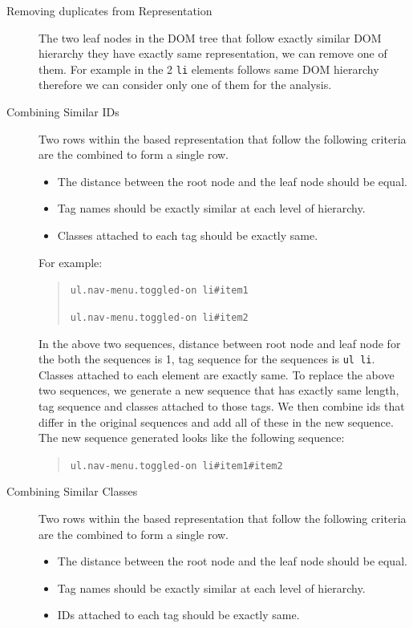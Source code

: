 		\begin{description}
			\item[Removing duplicates from \css Representation]
			The two leaf nodes in the DOM tree that follow exactly similar DOM hierarchy \ie they have exactly same \css representation, we can remove one of them. For example in  the 2 \texttt{li} elements follows same DOM hierarchy therefore we can consider only one of them for the analysis.
		
			\item[Combining Similar IDs]
			Two rows within the \css based representation that follow the following criteria are the combined to form a single row. 

			\begin{itemize}
				\item The distance between the root node and the leaf node should be equal.
				\item Tag names should be exactly similar at each level of hierarchy.
				\item Classes attached to each tag should be exactly same.
			\end{itemize}

			For example:
			
			\begin{quote}
				\texttt{ul.nav-menu.toggled-on li\#item1}
	
				\texttt{ul.nav-menu.toggled-on li\#item2}
			\end{quote}

			In the above two sequences, distance between root node and leaf node for the both the sequences is 1, tag sequence for the sequences is \texttt{ul li}. Classes attached to each element are exactly same. To replace the above two sequences, we generate a new sequence that has exactly same length, tag sequence and classes attached to those tags. We then combine ids that differ in the original sequences and add all of these in the new sequence. The new sequence generated looks like the following sequence:

			\begin{quote}
				\texttt{ul.nav-menu.toggled-on li\#item1\#item2}
			\end{quote}


			\item[Combining Similar Classes]
			Two rows within the \css based representation that follow the following criteria are the combined to form a single row. 
			
			\begin{itemize}
				\item The distance between the root node and the leaf node should be equal.
				\item Tag names should be exactly similar at each level of hierarchy.
				\item IDs attached to each tag should be exactly same.
			\end{itemize}


\end{description}

